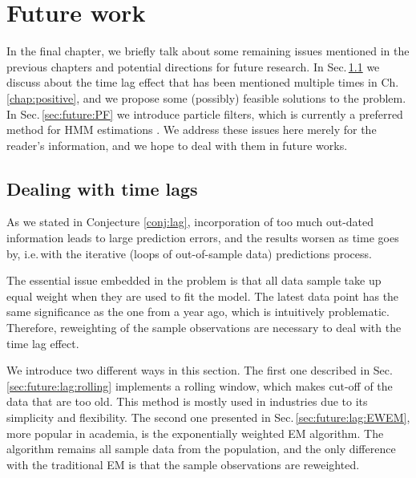 
\chapter{Future work}
\label{chap:future}

In the final chapter, 
we briefly talk about some remaining issues mentioned in the previous chapters
and potential directions for future research.
In Sec.\,\ref{sec:future:lag} we discuss about the time lag effect that has been mentioned
multiple times in Ch.\,\ref{chap:positive},
and we propose some (possibly) feasible solutions to the problem.
In Sec.\,\ref{sec:future:PF} we introduce particle filters,
which is currently a preferred method for HMM estimations \cite{Jacob:2015um}.
We address these issues here merely for the reader's information,
and we hope to deal with them in future works.


\section{Dealing with time lags}
\label{sec:future:lag}
As we stated in Conjecture \ref{conj:lag},
incorporation of too much out-dated information leads to large prediction errors,
and the results worsen as time goes by,
i.e.\,with the iterative (loops of out-of-sample data) predictions process.

The essential issue embedded in the problem is that all data sample take up equal weight
when they are used to fit the model.
The latest data point has the same significance as the one from a year ago,
which is intuitively problematic.
Therefore, reweighting of the sample observations are necessary to deal with the time lag effect.

We introduce two different ways in this section.
The first one described in Sec.\,\ref{sec:future:lag:rolling} implements a rolling window,
which makes cut-off of the data that are too old.
This method is mostly used in industries due to its simplicity and flexibility.
The second one presented in Sec.\,\ref{sec:future:lag:EWEM}, more popular in academia,
is the exponentially weighted EM algorithm.
The algorithm remains all sample data from the population,
and the only difference with the traditional EM is that the sample observations are reweighted.



